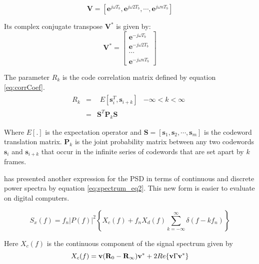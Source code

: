 \begin{equation}
	\mathbf{V}= \left[\mathbf{e}^{j\omega T_b}, \mathbf{e}^{j\omega 2T_b}, \cdots,\mathbf{e}^{j\omega nT_b}\right]
\label{eq:vectorV}
\end{equation}

Its complex conjugate transpose $\mathbf{V^*}$ is given by:
\begin{equation}
	\mathbf{V^*}=
		\left[
		\begin{array}{l}
		\mathbf{e}^{-j\omega T_b} \\
		\mathbf{e}^{-j\omega 2T_b} \\
		\cdots \\
		\mathbf{e}^{-j\omega nT_b}
		\end{array}
		\right]
\end{equation}

The parameter $R_k$ is the code correlation matrix defined by equation \ref{eq:corrCoef}.
\begin{eqnarray} \label{eq:corrCoef}
 R_k &=& 
\begin{array}{lc}
   E[\mathbf{s}_i^{T}, \mathbf{s}_{i+k}]  &  -\infty  < k < \infty
\end{array} \nonumber \\
			&=& \mathbf{S}^T \mathbf{P}_k \mathbf{S}
\end{eqnarray}

Where $E[.]$ is the expectation operator and $\mathbf{S} = [\mathbf{s}_1, \mathbf{s}_2, \cdots, \mathbf{s}_m]$ is the codeword translation matrix.  $\mathbf{P}_k$ is the joint probability matrix between any two codewords $\mathbf{s}_{i}$ and $\mathbf{s}_{i+k}$ that occur in the infinite series of codewords that are set apart by $k$ frames.

\cite{cariolaro1974spectra} has presented another expression for the PSD in terms of continuous and discrete power spectra by equation \ref{eq:spectrum_eq2}. This new form is easier to evaluate on digital computers.

\begin{equation}
    S_x(f) = f_n |P(f)|^2 \left\{X_c(f) + f_n X_d(f) \sum_{k=-\infty}^{\infty} \delta (f - k f_n) \right\}
\label{eq:spectrum_eq2}
\end{equation}

Here $X_c(f)$ is the continuous component of the signal spectrum given by 
\begin{equation} 
\label{eq:contSpec}
    X_c(f) =\mathbf{v} (\mathbf{R}_0 - \mathbf{R}_{\infty}) \mathbf{v}^* + 
					2 Re \{\mathbf{v} \Gamma \mathbf{v}^* \} \\
\end{equation}

